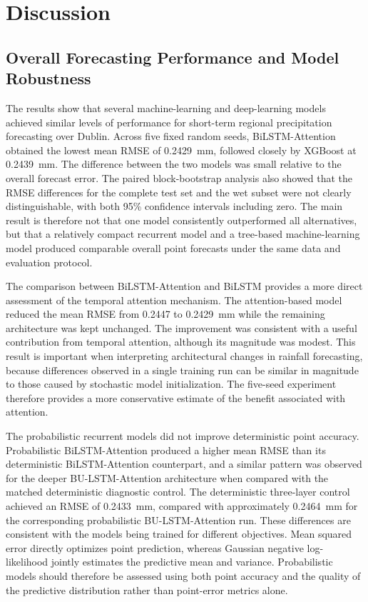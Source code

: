 \documentclass[referee,pdflatex,sn-basic]{sn-jnl}%
\theoremstyle{thmstyleone}%
\theoremstyle{thmstyletwo}%
\theoremstyle{thmstylethree}%
\begin{document}
\section{Discussion}

\subsection{Overall Forecasting Performance and Model Robustness}

The results show that several machine-learning and deep-learning models achieved similar levels of performance for short-term regional precipitation forecasting over Dublin. Across five fixed random seeds, BiLSTM-Attention obtained the lowest mean RMSE of 0.2429~mm, followed closely by XGBoost at 0.2439~mm. The difference between the two models was small relative to the overall forecast error. The paired block-bootstrap analysis also showed that the RMSE differences for the complete test set and the wet subset were not clearly distinguishable, with both 95\% confidence intervals including zero. The main result is therefore not that one model consistently outperformed all alternatives, but that a relatively compact recurrent model and a tree-based machine-learning model produced comparable overall point forecasts under the same data and evaluation protocol.

The comparison between BiLSTM-Attention and BiLSTM provides a more direct assessment of the temporal attention mechanism. The attention-based model reduced the mean RMSE from 0.2447 to 0.2429~mm while the remaining architecture was kept unchanged. The improvement was consistent with a useful contribution from temporal attention, although its magnitude was modest. This result is important when interpreting architectural changes in rainfall forecasting, because differences observed in a single training run can be similar in magnitude to those caused by stochastic model initialization. The five-seed experiment therefore provides a more conservative estimate of the benefit associated with attention.

The probabilistic recurrent models did not improve deterministic point accuracy. Probabilistic BiLSTM-Attention produced a higher mean RMSE than its deterministic BiLSTM-Attention counterpart, and a similar pattern was observed for the deeper BU-LSTM-Attention architecture when compared with the matched deterministic diagnostic control. The deterministic three-layer control achieved an RMSE of 0.2433~mm, compared with approximately 0.2464~mm for the corresponding probabilistic BU-LSTM-Attention run. These differences are consistent with the models being trained for different objectives. Mean squared error directly optimizes point prediction, whereas Gaussian negative log-likelihood jointly estimates the predictive mean and variance. Probabilistic models should therefore be assessed using both point accuracy and the quality of the predictive distribution rather than point-error metrics alone.
\end{document}
